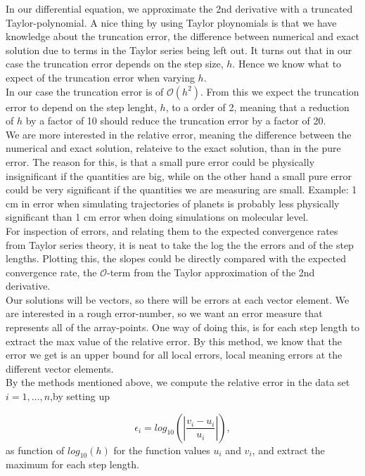 \documentclass{article}
\begin{document}
In our differential equation, we approximate the 2nd derivative with a truncated Taylor-polynomial. A nice thing by using Taylor ploynomials is that we have knowledge about the truncation error, the difference between numerical and exact solution due to terms in the Taylor series being left out. It turns out that in our case the truncation error depends on the step size, $h$. Hence we know what to expect of the truncation error when varying $h$. \\

In our case the truncation error is of $\mathcal{O}(h^2)$. From this we expect the truncation error to depend on the step lenght, $h$, to a order of 2, meaning that a reduction of $h$ by a factor of 10 should reduce the truncation error by a factor of 20.\\

We are more interested in the relative error, meaning the difference between the numerical and exact solution, relateive to the exact solution, than in the pure error. The reason for this, is that a small pure error could be physically insignificant if the quantities are big, while on the other hand a small pure error could be very significant if the quantities we are measuring are small. Example: 1 cm in error when simulating trajectories of planets is probably less physically significant than 1 cm error when doing simulations on molecular level.\\

For inspection of errors, and relating them to the expected convergence rates from Taylor series theory, it is neat to take the log the the errors and of the step lengths. Plotting this, the slopes could be directly compared with the expected convergence rate, the $\mathcal{O}$-term from the Taylor approximation of the 2nd derivative.\\

Our solutions will be vectors, so there will be errors at each vector element. We are interested in a rough error-number, so we want an error measure that represents all of the array-points. One way of doing this, is for each step length to extract the max value of the relative error. By this method, we know that the error we get is an upper bound for all local errors, local meaning errors at the different vector elements.\\

By the methods mentioned above, we compute the relative error in the data set $i=1,\dots, n$,by setting up

\[
\epsilon_i=log_{10}\left(\left|\frac{v_i-u_i}
{u_i}\right|\right),
\]
as function of $log_{10}(h)$ for the function values $u_i$ and $v_i$, and extract the maximum for each step length.\\
\end{document}
